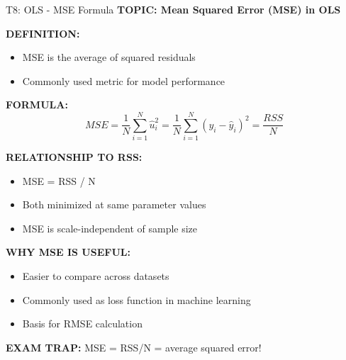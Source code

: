 \documentclass[8pt]{beamer}
\begin{document}
	\begin{frame}{T8: OLS - MSE Formula}
		\fontsize{6.5}{7.5}\selectfont
		\textbf{TOPIC: Mean Squared Error (MSE) in OLS}
		
		\vspace{0.1cm}
		\textbf{DEFINITION:}
		\begin{itemize}
			\item MSE is the average of squared residuals
			\item Commonly used metric for model performance
		\end{itemize}
		
		\vspace{0.1cm}
		\textbf{FORMULA:}
		\[
		MSE = \frac{1}{N}\sum_{i=1}^N \hat{u}_i^2 = \frac{1}{N}\sum_{i=1}^N (y_i - \hat{y}_i)^2 = \frac{RSS}{N}
		\]
		
		\vspace{0.1cm}
		\textbf{RELATIONSHIP TO RSS:}
		\begin{itemize}
			\item MSE = RSS / N
			\item Both minimized at same parameter values
			\item MSE is scale-independent of sample size
		\end{itemize}
		
		\vspace{0.1cm}
		\textbf{WHY MSE IS USEFUL:}
		\begin{itemize}
			\item Easier to compare across datasets
			\item Commonly used as loss function in machine learning
			\item Basis for RMSE calculation
		\end{itemize}
		
		\textcolor{myred}{\textbf{EXAM TRAP:}} MSE = \textcolor{myblue}{RSS/N} = average squared error!
	\end{frame}
	
\end{document}

